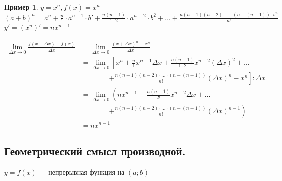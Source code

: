 \documentclass[12pt, a4paper]{article}
\newtheorem{example}{Пример}[subsection]
\theoremstyle{remark}
\begin{document}
	\begin{example}
		$y = x^n, f(x) = x^n$ \\
		
		$(a + b)^n = a^n + \frac{n}{1} \cdot a^{n - 1} \cdot b' + \frac{n(n - 1)}{1 \cdot 2} \cdot a^{n - 2} \cdot b^2 + ... + \frac{n(n - 1)(n - 2)\cdot ... \cdot (n - (n - 1)) \cdot b^n}{n!}$ \\
		
		$y' = (x^n)' = nx^{n - 1}$
		
		\begin{align*}
			\lim_{\Delta x \to 0} \frac{f(x + \Delta x) - f(x)}{\Delta x} 
			&= \lim_{\Delta x \to 0} \frac{(x + \Delta x)^n - x^n}{\Delta x} \\[10pt]
			&= \lim_{\Delta x \to 0} \left[ x^n + \frac{n}{1} x^{n - 1} \Delta x + \frac{n(n - 1)}{1 \cdot 2} x^{n - 2} (\Delta x)^2 + \dots \right. \\
			&\qquad\qquad \left. + \frac{n(n - 1)(n - 2) \cdot \ldots \cdot (n - (n - 1))}{n!} (\Delta x)^n - x^n \right] : \Delta x \\[10pt]
			&= \lim_{\Delta x \to 0} \left( n x^{n - 1} + \frac{n(n - 1)}{2!} x^{n - 2} \Delta x + \dots \right. \\
			&\qquad\qquad \left. + \frac{n(n - 1)(n - 2) \cdot \ldots \cdot (n - (n - 1))}{n!} (\Delta x)^{n - 1} \right) \\[10pt]
			&= n x^{n - 1}
		\end{align*}
	\end{example}
	
	\newpage
	
	\subsection{Геометрический смысл производной.}
	
	\noindent \(y = f(x)\) --- непрерывная функция на \((a; b)\)
	
	\vspace{0.3cm}
	
\end{document}
